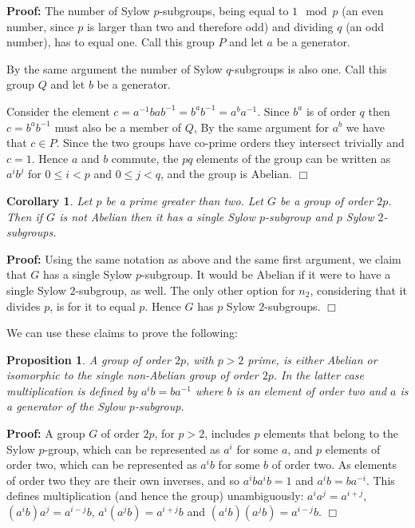 \documentclass[11pt]{article} \usepackage{amssymb}
\newtheorem{proposition}[theorem]{Proposition}
\newtheorem{corollary}[theorem]{Corollary}
\newenvironment{proof}{\noindent \textbf{Proof:}}{$\Box$}
\begin{document}
\begin{enumerate}
\begin{proof}
      The number of Sylow $p$-subgroups, 
      being equal to $1\mod p$ (an even number, since $p$ is larger than two
      and therefore odd) and dividing $q$ (an odd number), 
      has to equal one. Call this group $P$ and let $a$ be a generator.
      
      By the same argument the number of Sylow $q$-subgroups is also one.
      Call this group $Q$ and let $b$ be a generator.
      
      Consider the element $c=a^{-1}bab^{-1}=b^ab^{-1}=a^ba^{-1}$. Since
      $b^a$ is of order $q$ then $c=b^ab^{-1}$ must also be a member of $Q$, 
      By the same argument for $a^b$ we have that $c \in P$. Since
      the two groups have co-prime orders they intersect trivially and $c=1$. 
      Hence $a$ and $b$ commute, the $pq$ elements of the group can be written 
      as $a^ib^j$ for $0\leq i <p$ and $0\leq j < q$, and the group is Abelian.
    \end{proof}
    \begin{corollary}
      \label{prop:2p_groups}
      Let $p$ be a prime greater than two. Let $G$ be a group of order
      $2p$. Then if $G$ is not Abelian then it has a single Sylow $p$-subgroup
      and $p$ Sylow $2$-subgroups.
    \end{corollary}
    \begin{proof}
      Using the same notation as above and the same first argument, we claim
      that $G$ has a single Sylow $p$-subgroup. It would be Abelian if it were 
      to have a single Sylow $2$-subgroup, as well. The only other option for
      $n_2$, considering that it divides $p$, is for it to equal $p$. Hence
      $G$ has $p$ Sylow $2$-subgroups.
    \end{proof}

    We can use these claims to prove the following:
    \begin{proposition}
      \label{prop:2p_unique}
      A group of order $2p$, with $p>2$ prime, is either Abelian or isomorphic 
      to the single non-Abelian
      group of order $2p$. In the latter case multiplication is defined by
      $a^ib=ba^{-1}$ where $b$ is an element of order two and $a$ is a generator
      of the Sylow $p$-subgroup.
    \end{proposition}
    \begin{proof}
      A group $G$ of order $2p$, for $p>2$, includes $p$ elements that 
      belong to the Sylow $p$-group,
      which can be represented as $a^i$ for some $a$, and $p$ elements of order
      two, which can be represented as $a^ib$ for some $b$ of order two. As
      elements of order two they are their own inverses, and so $a^iba^ib=1$ and
      $a^ib=ba^{-i}$. This defines multiplication (and hence the group) 
      unambiguously: $a^ia^j=a^{i+j}$,
      $(a^ib)a^j=a^{i-j}b$, $a^i(a^jb)=a^{i+j}b$ and $(a^ib)(a^jb)=a^{i-j}b$.
    \end{proof}


\end{enumerate}
\end{document}
